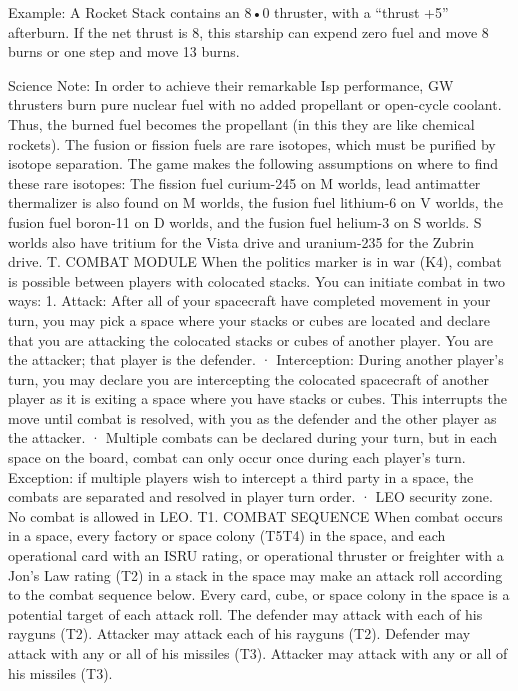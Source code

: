 \documentclass[a4paper]{book}
\begin{document}
Example: A Rocket Stack contains an 8•0 thruster, with a “thrust +5” afterburn. If the net thrust is 8, this starship can expend zero fuel and move 8 burns or one step and move 13 burns.

Science Note: In order to achieve their remarkable Isp performance, GW thrusters burn pure nuclear fuel with no added propellant or open-cycle coolant. Thus, the burned fuel becomes the propellant (in this they are like chemical rockets). The fusion or fission fuels are rare isotopes, which must be purified by isotope separation. The game makes the following assumptions on where to find these rare isotopes: The fission fuel curium-245 on M worlds, lead antimatter thermalizer is also found on M worlds, the fusion fuel lithium-6 on V worlds, the fusion fuel boron-11 on D worlds, and the fusion fuel helium-3 on S worlds. S worlds also have tritium for the Vista drive and uranium-235 for the Zubrin drive.
T. COMBAT MODULE
When the politics marker is in war (K4), combat is possible between players with colocated stacks. You can initiate combat in two ways:
1.   Attack: After all of your spacecraft have completed movement in your turn, you may pick a space where your stacks or cubes are located and declare that you are attacking the colocated stacks or cubes of another player. You are the attacker; that player is the defender.
·   	Interception: During another player’s turn, you may declare you are intercepting the colocated spacecraft of another player as it is exiting a space where you have stacks or cubes. This interrupts the move until combat is resolved, with you as the defender and the other player as the attacker.
·   	Multiple combats can be declared during your turn, but in each space on the board, combat can only occur once during each player’s turn. Exception: if multiple players wish to intercept a third party in a space, the combats are separated and resolved in player turn order.
·   	LEO security zone. No combat is allowed in LEO.
T1. COMBAT SEQUENCE
When combat occurs in a space, every factory or space colony (T5T4) in the space, and each operational card with an ISRU rating, or operational thruster or freighter with a Jon’s Law rating (T2) in a stack in the space may make  an attack roll according to the combat sequence below. Every card, cube, or space colony in the space is a potential target of each attack roll.
The defender may attack with each of his rayguns (T2).
Attacker may attack each of his rayguns (T2).
 Defender may attack with any or all of his missiles (T3).
Attacker may attack with any or all of his missiles (T3).
\end{document}
